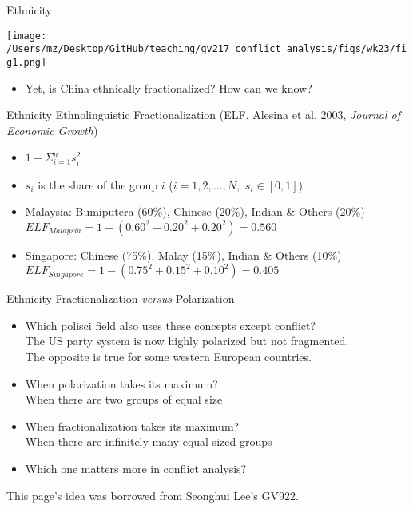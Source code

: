 \documentclass[handout]{beamer}
\begin{document}
\begin{frame}{Ethnicity}
    \pause
    \begin{center}
        \texttt{[image: /Users/mz/Desktop/GitHub/teaching/gv217\_conflict\_analysis/figs/wk23/fig1.png]}
    \end{center}
    \begin{itemize}
        \pause\item Yet, is China ethnically fractionalized? How can we know?    
    \end{itemize}
\end{frame}

\begin{frame}{Ethnicity}
    \pause Ethnolinguistic Fractionalization (ELF, Alesina et al. 2003, \textit{Journal of Economic Growth})
    \begin{itemize}
        \pause\item \(1 - \Sigma_{i = 1}^{n} s_{i}^2\)
        \pause\item \(s_{i}\) is the share of the group \(i\) (\(i = 1, 2, \ldots, N, \) \(s_{i} \in [0, 1]\))
        \pause\item Malaysia: Bumiputera (60\%), Chinese (20\%), Indian \& Others (20\%)
        \pause      \(ELF_{Malaysia} = 1 - (0.60^2 + 0.20^2 + 0.20^2) = 0.560\)
        \pause\item Singapore: Chinese (75\%), Malay (15\%), Indian \& Others (10\%)
        \pause      \(ELF_{Singapore} = 1 - (0.75^2 + 0.15^2 + 0.10^2) = 0.405\)
    \end{itemize}
\end{frame}

\begin{frame}{Ethnicity}
    \pause Fractionalization \textit{versus} Polarization
    \begin{itemize}
        \pause\item Which polisci field also uses these concepts except conflict?\\
        \pause      The US party system is now highly polarized but not fragmented.\\
        \pause      The opposite is true for some western European countries.
        \pause\item When polarization takes its maximum?\\
        \pause      When there are two groups of equal size
        \pause\item When fractionalization takes its maximum?\\
        \pause      When there are infinitely many equal-sized groups
        \pause\item Which one matters more in conflict analysis?
\end{itemize}
\vfill
\tiny This page's idea was borrowed from Seonghui Lee's GV922.
\end{frame}
\end{document}
